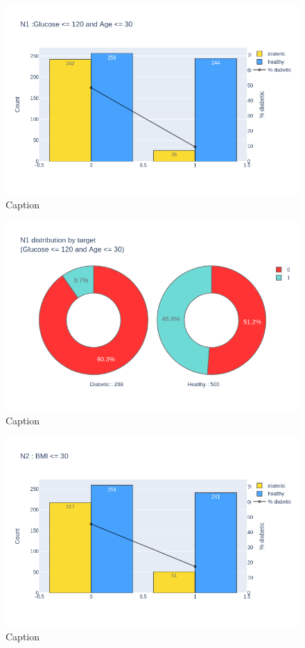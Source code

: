 \documentclass[12pt]{article}
\begin{document}
\begin{figure}[ht]
\centering
\includegraphics[width=1\textwidth]{newplot(13).png}
\caption{\label{fig:23} Caption}
\end{figure}

\begin{figure}[ht]
\centering
\includegraphics[width=1\textwidth]{newplot(14).png}
\caption{\label{fig:24} Caption}
\end{figure}

\begin{figure}[ht]
\centering
\includegraphics[width=1\textwidth]{newplot(15).png}
\caption{\label{fig:25} Caption}
\end{figure}
\end{document}
